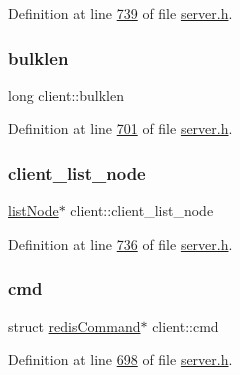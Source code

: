 Definition at line \hyperlink{server_8h_source_l00739}{739} of file \hyperlink{server_8h_source}{server.\+h}.

\mbox{\label{structclient_acaa9bcbed32eea1c9fcf60c775b6f498}} 
\subsubsection{\texorpdfstring{bulklen}{bulklen}}
{\footnotesize\ttfamily long client\+::bulklen}



Definition at line \hyperlink{server_8h_source_l00701}{701} of file \hyperlink{server_8h_source}{server.\+h}.

\mbox{\label{structclient_a3bf7cb0753f83fba41bc06368914d288}} 
\subsubsection{\texorpdfstring{client\+\_\+list\+\_\+node}{client\_list\_node}}
{\footnotesize\ttfamily \hyperlink{structlistNode}{list\+Node}$\ast$ client\+::client\+\_\+list\+\_\+node}



Definition at line \hyperlink{server_8h_source_l00736}{736} of file \hyperlink{server_8h_source}{server.\+h}.

\mbox{\label{structclient_a072fb7c3464d4f640159169ee4d0a5bc}} 
\subsubsection{\texorpdfstring{cmd}{cmd}}
{\footnotesize\ttfamily struct \hyperlink{structredisCommand}{redis\+Command}$\ast$ client\+::cmd}



Definition at line \hyperlink{server_8h_source_l00698}{698} of file \hyperlink{server_8h_source}{server.\+h}.

\mbox{\label{structclient_ae2b581131b3efce72bf0607760f7aa06}} 
